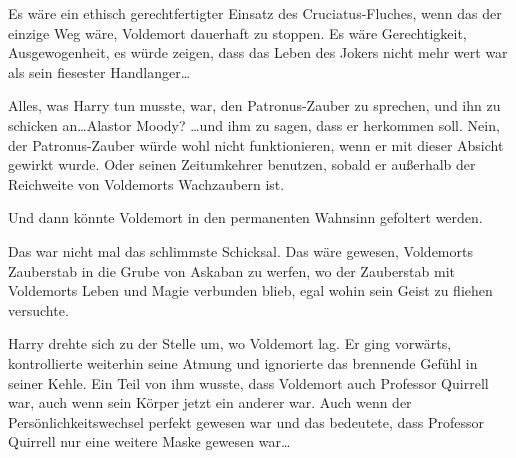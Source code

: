 Es wäre ein ethisch gerechtfertigter Einsatz des Cruciatus-Fluches, wenn das der einzige Weg wäre, Voldemort dauerhaft zu stoppen. Es wäre Gerechtigkeit, Ausgewogenheit, es würde zeigen, dass das Leben des Jokers nicht mehr wert war als sein fiesester Handlanger…

Alles, was Harry tun musste, war, den Patronus-Zauber zu sprechen, und ihn zu schicken an…Alastor Moody? …und ihm zu sagen, dass er herkommen soll. Nein, der Patronus-Zauber würde wohl nicht funktionieren, wenn er mit dieser Absicht gewirkt wurde. Oder seinen Zeitumkehrer benutzen, sobald er außerhalb der Reichweite von Voldemorts Wachzaubern ist.

Und dann könnte Voldemort in den permanenten Wahnsinn gefoltert werden.

Das war nicht mal das schlimmste Schicksal. Das wäre gewesen, Voldemorts Zauberstab in die Grube von Askaban zu werfen, wo der Zauberstab mit Voldemorts Leben und Magie verbunden blieb, egal wohin sein Geist zu fliehen versuchte.

Harry drehte sich zu der Stelle um, wo Voldemort lag. Er ging vorwärts, kontrollierte weiterhin seine Atmung und ignorierte das brennende Gefühl in seiner Kehle. Ein Teil von ihm wusste, dass Voldemort auch Professor Quirrell war, auch wenn sein Körper jetzt ein anderer war. Auch wenn der Persönlichkeitswechsel perfekt gewesen war und das bedeutete, dass Professor Quirrell nur eine weitere Maske gewesen war…

